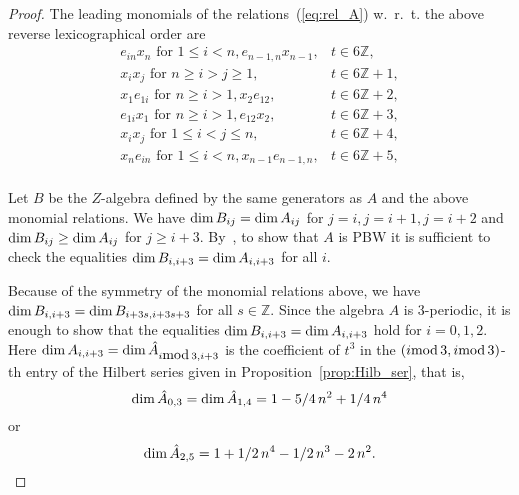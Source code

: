 \documentclass{amsart}
\numberwithin{equation}{section}
\theoremstyle{plain}
\theoremstyle{definition}
\begin{document}
\begin{proof}
The leading monomials of the relations~(\ref{eq:rel_A}) w.~r.~t. the above
reverse lexicographical order are
\begin{equation}
\label{eq:lead_terms}
\begin{array}{lll}
e_{in} x_n \mbox{ for } 1\le i <n, e_{n-1,n}x_{n-1},  & t \in 6 {\ensuremath{\mathbb Z}},\\
x_i x_j \mbox{ for } n\ge i > j \ge 1, & t \in 6 {\ensuremath{\mathbb Z}}+1, \\
x_1 e_{1i} \mbox{ for } n\ge i>1, x_{2} e_{12},  & t \in 6 {\ensuremath{\mathbb Z}}+2,\\
e_{1i} x_1 \mbox{ for } n\ge i>1, e_{12} x_{2} ,  & t \in 6 {\ensuremath{\mathbb Z}}+3,\\
x_i x_j \mbox{ for } 1 \le i < j \le n, & t \in 6 {\ensuremath{\mathbb Z}}+4, \\
x_n e_{in} \mbox{ for } 1\le i <n, x_{n-1} e_{n-1,n},  & t \in 6 {\ensuremath{\mathbb Z}}+5,\\
\end{array}
\end{equation}

Let $ B $ be the $Z$-algebra defined by the same generators as $A$
and the above monomial relations. We have ${\mbox{dim\,}} B_{ij} = {\mbox{dim\,}}
A_{ij}$ for $j=i, j=i+1, j=i+2$ and ${\mbox{dim\,}} B_{ij} \ge  {\mbox{dim\,}} A_{ij}$
for $j\ge i+3$.   By~\cite[Prop.~10.1 of Ch.~4]{PP}, to show that
$A$ is PBW  it is sufficient to check the equalities ${\mbox{dim\,}} B_{i,
i+3} = {\mbox{dim\,}} A_{i, i+3}$ for all $i$.

Because of the symmetry of the monomial relations above, we have
${\mbox{dim\,}} B_{i, i+3} = {\mbox{dim\,}} B_{i+3s, i+3s+3} $ for all $s\in {\ensuremath{\mathbb Z}}$.
  Since the algebra $A$ is
3-periodic, it is enough to show that the equalities  ${\mbox{dim\,}} B_{i,
i+3} = {\mbox{dim\,}} A_{i, i+3}$ hold for $i=0,1,2$. Here  ${\mbox{dim\,}} A_{i,i+3}
= {\mbox{dim\,}}\hat A_{i {\mbox{mod\,}} 3,i+3}$ is the coefficient of $t^3$ in the
$(i {\mbox{mod\,}} 3 ,i {\mbox{mod\,}} 3)$-th entry of the Hilbert series given in
Proposition~\ref{prop:Hilb_ser}, that is,
$$
{\mbox{dim\,}} \hat A_{0,3} = {\mbox{dim\,}} \hat A_{1,4} =
1-5/4\,{n}^{2}+1/4\,{n}^{4}
$$
or
$$
{\mbox{dim\,}} \hat A_{2,5} =  1+1/2\,{n}^{4}-1/2\,{n}^{3}-2\,{n}^{2}. 
$$


\end{proof}
\end{document}
